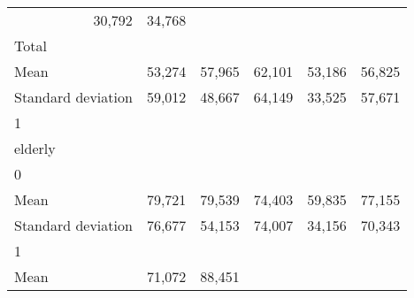 \begin{tabular}{llllll}
  \multicolumn{1}{r}{30,792} &
  \multicolumn{1}{r}{34,768} \\
\multicolumn{1}{l}{\hspace{3em}Total} &
  \multicolumn{1}{|r}{} &
  \multicolumn{1}{r}{} &
  \multicolumn{1}{r}{} &
  \multicolumn{1}{r}{} &
  \multicolumn{1}{r}{} \\
\multicolumn{1}{l}{\hspace{4em}Mean} &
  \multicolumn{1}{|r}{53,274} &
  \multicolumn{1}{r}{57,965} &
  \multicolumn{1}{r}{62,101} &
  \multicolumn{1}{r}{53,186} &
  \multicolumn{1}{r}{56,825} \\
\multicolumn{1}{l}{\hspace{4em}Standard deviation} &
  \multicolumn{1}{|r}{59,012} &
  \multicolumn{1}{r}{48,667} &
  \multicolumn{1}{r}{64,149} &
  \multicolumn{1}{r}{33,525} &
  \multicolumn{1}{r}{57,671} \\
\multicolumn{1}{l}{\hspace{1em}1} &
  \multicolumn{1}{|r}{} &
  \multicolumn{1}{r}{} &
  \multicolumn{1}{r}{} &
  \multicolumn{1}{r}{} &
  \multicolumn{1}{r}{} \\
\multicolumn{1}{l}{\hspace{2em}elderly} &
  \multicolumn{1}{|r}{} &
  \multicolumn{1}{r}{} &
  \multicolumn{1}{r}{} &
  \multicolumn{1}{r}{} &
  \multicolumn{1}{r}{} \\
\multicolumn{1}{l}{\hspace{3em}0} &
  \multicolumn{1}{|r}{} &
  \multicolumn{1}{r}{} &
  \multicolumn{1}{r}{} &
  \multicolumn{1}{r}{} &
  \multicolumn{1}{r}{} \\
\multicolumn{1}{l}{\hspace{4em}Mean} &
  \multicolumn{1}{|r}{79,721} &
  \multicolumn{1}{r}{79,539} &
  \multicolumn{1}{r}{74,403} &
  \multicolumn{1}{r}{59,835} &
  \multicolumn{1}{r}{77,155} \\
\multicolumn{1}{l}{\hspace{4em}Standard deviation} &
  \multicolumn{1}{|r}{76,677} &
  \multicolumn{1}{r}{54,153} &
  \multicolumn{1}{r}{74,007} &
  \multicolumn{1}{r}{34,156} &
  \multicolumn{1}{r}{70,343} \\
\multicolumn{1}{l}{\hspace{3em}1} &
  \multicolumn{1}{|r}{} &
  \multicolumn{1}{r}{} &
  \multicolumn{1}{r}{} &
  \multicolumn{1}{r}{} &
  \multicolumn{1}{r}{} \\
\multicolumn{1}{l}{\hspace{4em}Mean} &
  \multicolumn{1}{|r}{71,072} &
  \multicolumn{1}{r}{88,451} &

\end{tabular}
